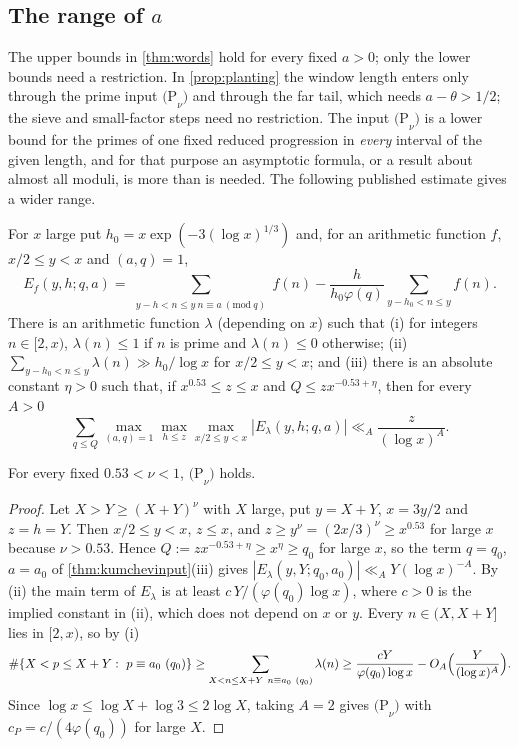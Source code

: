 \documentclass[11pt]{article}
\begin{document}
\subsection{\texorpdfstring{The range of $a$}{The range of a}}\label{subsec:range}

The upper bounds in \cref{thm:words} hold for every fixed $a>0$; only the lower
bounds need a restriction. In \cref{prop:planting} the window length enters
only through the prime input $\mathrm{(P}_\nu\mathrm{)}$ and through the far
tail, which needs $a-\theta>1/2$; the sieve and small-factor steps need no
restriction. The input $\mathrm{(P}_\nu\mathrm{)}$ is a lower bound for the
primes of one fixed reduced progression in \emph{every} interval of the given
length, and for that purpose an asymptotic formula, or a result about almost
all moduli, is more than is needed. The following published estimate gives a
wider range.

\begin{theorem}\label{thm:kumchevinput}
For $x$ large put $h_0=x\exp(-3(\log x)^{1/3})$ and, for an arithmetic function
$f$, $x/2\le y<x$ and $(a,q)=1$,
\[
E_f(y,h;q,a)=\sum_{\substack{y-h<n\le y\ n\equiv a\ (\mathrm{mod}\ q)}}f(n)-\frac{h}{h_0\varphi(q)}\sum_{y-h_0<n\le y}f(n).
\]
There is an arithmetic function $\lambda$ \textup{(}depending on $x$\textup{)}
such that \textup{(i)} for integers $n\in[2,x)$, $\lambda(n)\le1$ if $n$ is
prime and $\lambda(n)\le0$ otherwise; \textup{(ii)}
$\sum_{y-h_0<n\le y}\lambda(n)\gg h_0/\log x$ for $x/2\le y<x$; and
\textup{(iii)} there is an absolute constant $\eta>0$ such that, if
$x^{0.53}\le z\le x$ and $Q\le zx^{-0.53+\eta}$, then for every $A>0$
\[
\sum_{q\le Q}\max_{(a,q)=1}\max_{h\le z}\max_{x/2\le y<x}|E_\lambda(y,h;q,a)|\ll_A\frac{z}{(\log x)^A}.
\]
\end{theorem}

\begin{lemma}\label{lem:kumchevfixed}
For every fixed $0.53<\nu<1$, $\mathrm{(P}_\nu\mathrm{)}$ holds.
\end{lemma}

\begin{proof}
Let $X>Y\ge(X+Y)^\nu$ with $X$ large, put $y=X+Y$, $x=3y/2$ and $z=h=Y$. Then
$x/2\le y<x$, $z\le x$, and $z\ge y^\nu=(2x/3)^\nu\ge x^{0.53}$ for large $x$
because $\nu>0.53$. Hence $Q:=zx^{-0.53+\eta}\ge x^{\eta}\ge q_0$ for large $x$,
so the term $q=q_0$, $a=a_0$ of \cref{thm:kumchevinput}(iii) gives
$|E_\lambda(y,Y;q_0,a_0)|\ll_AY(\log x)^{-A}$. By (ii) the main term of
$E_\lambda$ is at least $c\,Y/(\varphi(q_0)\log x)$, where $c>0$ is the implied
constant in (ii), which does not depend on $x$ or $y$. Every
$n\in(X,X+Y]$ lies in $[2,x)$, so by (i)
\[
\#\{X<p\le X+Y:\ p\equiv a_0\ (q_0)\}\ge\sum_{\substack{X<n\le X+Y\ n\equiv a_0\ (q_0)}}\lambda(n)
\ge\frac{cY}{\varphi(q_0)\log x}-O_A\Bigl(\frac{Y}{(\log x)^A}\Bigr).
\]
Since $\log x\le\log X+\log3\le2\log X$, taking $A=2$ gives
$\mathrm{(P}_\nu\mathrm{)}$ with $c_P=c/(4\varphi(q_0))$ for large $X$.
\end{proof}
\end{document}
